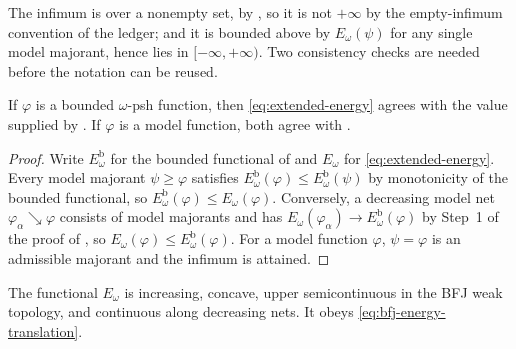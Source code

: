 The infimum is over a nonempty set, by
, so it is not $+\infty$ by the
empty-infimum convention of the ledger; and it is bounded above by
$E_\omega(\psi)$ for any single model majorant, hence lies in
$[-\infty,+\infty)$.  Two consistency checks are needed before the notation
can be reused.

\begin{lemma}
\label{lem:ch26-consistency}
If $\varphi$ is a bounded $\omega$-psh function, then
\eqref{eq:extended-energy} agrees with the value supplied by
.  If $\varphi$ is a model function,
both agree with .
\end{lemma}

\begin{proof}
Write $E^{\mathrm{b}}_\omega$ for the bounded functional of
 and $E_\omega$ for
\eqref{eq:extended-energy}.  Every model majorant $\psi\geq\varphi$
satisfies $E^{\mathrm{b}}_\omega(\varphi)\leq E_\omega^{\mathrm b}(\psi)$
by monotonicity of the bounded functional, so
$E^{\mathrm b}_\omega(\varphi)\leq E_\omega(\varphi)$.  Conversely, a
decreasing model net $\varphi_\alpha\searrow\varphi$ consists of model
majorants and has $E_\omega(\varphi_\alpha)\to
E^{\mathrm b}_\omega(\varphi)$ by Step~1 of the proof of
, so
$E_\omega(\varphi)\leq E^{\mathrm b}_\omega(\varphi)$.  For a model
function $\varphi$, $\psi=\varphi$ is an admissible majorant and the
infimum is attained.
\end{proof}

\begin{theorem}\label{thm:extended-energy-basic}
The functional $E_\omega$ is increasing, concave, upper semicontinuous in
the BFJ weak topology, and continuous along decreasing nets. It obeys
\eqref{eq:bfj-energy-translation}.
\end{theorem}

